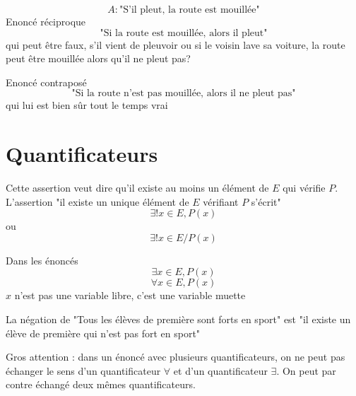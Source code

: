 \begin{exemples}
$$A:\text{"S'il pleut, la route est mouillée"}$$
Enoncé réciproque 
$$\text{"Si la route est mouillée, alors il pleut"}$$ qui peut être faux, s'il vient de pleuvoir ou si le voisin lave sa voiture, la route peut être mouillée alors qu'il ne pleut pas?\newline

Enoncé contraposé 
$$\text{"Si la route n'est pas mouillée, alors il ne pleut pas"}$$ qui lui est bien sûr tout le temps vrai
\end{exemples}
\section{Quantificateurs}
\newline


\begin{remarque}
Cette assertion veut dire qu'il existe au moins un élément de $E$ qui vérifie $P$. L'assertion "il existe un unique élément de $E$ vérifiant $P$ s'écrit" $$\exists ! x \in E,P(x)$$ ou $$\exists ! x\in E/P(x)$$
\end{remarque}
\newline


\begin{remarque}
Dans les énoncés 
$$\exists x \in E, P(x)$$
$$\forall x \in E, P(x)$$
$x$ n'est pas une variable libre, c'est une variable muette
\end{remarque}
\newline


\begin{exemple}
La négation de "Tous les élèves de première sont forts en sport" est "il existe un élève de première qui n'est pas fort en sport"
\end{exemple}
Gros attention : dans un énoncé avec plusieurs quantificateurs, on ne peut pas échanger le sens d'un quantificateur $\forall$ et d'un quantificateur $\exists$. On peut par contre échangé deux mêmes quantificateurs.\newline



